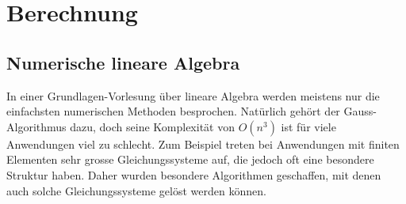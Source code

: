 %
%
%
\part{Berechnung}

\chapter*{Numerische lineare Algebra}
\rhead{}
In einer Grundlagen-Vorlesung über lineare Algebra werden meistens nur
die einfachsten numerischen Methoden besprochen.
Natürlich gehört der Gauss-Algorithmus dazu, doch seine Komplexität
von $O(n^3)$ ist für viele Anwendungen viel zu schlecht.
Zum Beispiel treten bei Anwendungen mit finiten Elementen sehr grosse
Gleichungssysteme auf, die jedoch oft eine besondere Struktur haben.
Daher wurden besondere Algorithmen geschaffen, mit denen auch solche
Gleichungssysteme gelöst werden können.






